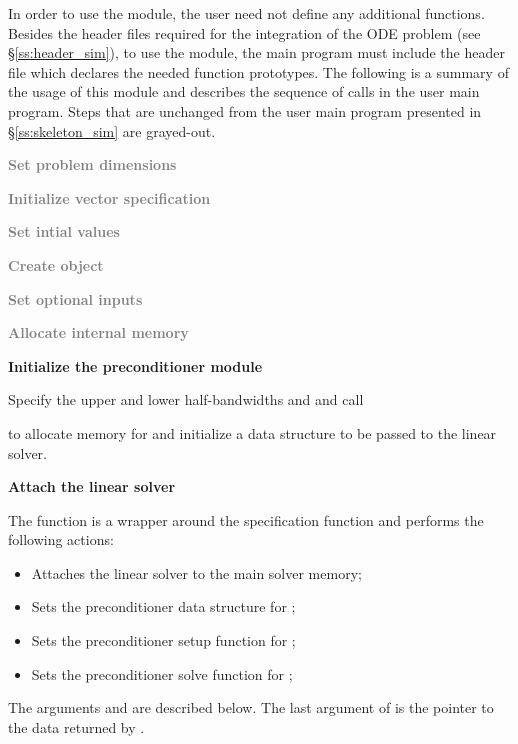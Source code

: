 In order to use the {\cvbandpre} module, the user need not define any
additional functions. 
Besides the header files required for the integration of the ODE problem
(see \S\ref{ss:header_sim}),  to use the {\cvbandpre} module, the main program 
must include the header file  which declares the needed
function prototypes.
The following is a summary of the usage of this module and describes the sequence 
of calls in the user main program. Steps that are unchanged from the user main
program presented in \S\ref{ss:skeleton_sim} are grayed-out.
\begin{Steps}
  
\item
  \textcolor{gray}{\bf Set problem dimensions}

\item
  \textcolor{gray}{\bf Initialize vector specification}

\item
  \textcolor{gray}{\bf Set intial values}
 
\item
  \textcolor{gray}{\bf Create {\cvode} object}

\item
  \textcolor{gray}{\bf Set optional inputs}

\item
  \textcolor{gray}{\bf Allocate internal memory}

\item \label{i:bandpre_init}
  {\bf Initialize the {\cvbandpre} preconditioner module}

  Specify the upper and lower half-bandwidths  and  and call 


  to allocate memory for and initialize a data structure  to be 
  passed to the {\cvspgmr} linear solver.

\item \label{i:bandpre_attach}
  {\bf Attach the {\cvspgmr} linear solver}


  The function  is a wrapper around the {\cvspgmr} specification
  function  and performs the following actions:
  \begin{itemize}
    \item Attaches the {\cvspgmr} linear solver to the main {\cvode} solver memory;
    \item Sets the preconditioner data structure for {\cvbandpre};
    \item Sets the preconditioner setup function for {\cvbandpre};
    \item Sets the preconditioner solve function for {\cvbandpre};
  \end{itemize}
  The arguments  and  are described below.
  The last argument of  is the pointer to the {\cvbandpre} data
  returned by .


\end{Steps}
